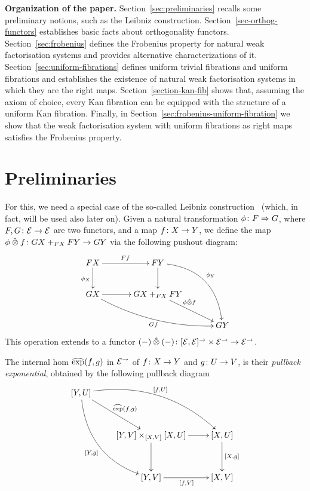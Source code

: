 \documentclass[reqno,10pt,a4paper,oneside]{amsart}
\begin{document}
\smallskip

\noindent
\textbf{Organization of the paper.} Section~\ref{sec:preliminaries} recalls some preliminary notions,
such as the Leibniz construction.
Section~\ref{sec-orthog-functors} establishes basic facts about orthogonality functors.
Section~\ref{sec:frobenius} defines the Frobenius property for natural weak factorisation
systems and provides alternative characterizations of it. 
Section~\ref{sec:uniform-fibrations} defines uniform trivial fibrations and uniform fibrations and
establishes the existence of natural weak factorisation systems in which they are the 
right maps.
Section~\ref{section-kan-fib} shows that, assuming the axiom of choice, every Kan fibration
can be equipped with the structure of a uniform Kan fibration.
Finally, in Section~\ref{sec:frobenius-uniform-fibration} we show that the weak factorisation system with
uniform fibrations as right maps satisfies the Frobenius property.


  
\section{Preliminaries}

For this,
we need a special case of the so-called Leibniz construction~\cite{riehl-verity:reedy} (which, in fact, will be used also later on). Given a natural transformation $\phi \colon F \Rightarrow
G$, where $F, G \colon \mathcal{E} \to \mathcal{E}$ are two functors, and a map $f \colon X \to Y$, we define the map~$\phi \mathbin{\hat{\otimes}} f \colon GX +_{FX} FY \to GY$ via the following
pushout diagram:
 \[
\xymatrix@C=1.2cm{
FX \ar[r]^{Ff}  \ar[d]_{\phi_X} & FY  \ar@/^2pc/[ddr]^{\phi_Y} \ar[d] & \\ 
GX \ar@/_1pc/[drr]_{Gf} \ar[r] &  GX +_{FX} FY \ar[dr]^-(.35){\phi \hatotimes f}  & \\ 
 & & GY } 
 \]
This operation extends to a functor $(-) \mathbin{\hat{\otimes}} (-) \colon [\mathcal{E}, \mathcal{E}]^\to \times \mathcal{E}^\to \to \mathcal{E}^\to$. 

The internal hom $\operatorname{\widehat{exp}}(f,g)$ in $\mathcal{E}^\to$ of $f \colon X \to Y$ and $g \colon U \to V$, is their \emph{pullback exponential}, obtained by the following pullback diagram
\[
\xymatrix@R=1.2cm{
[Y, U] \ar@/^2pc/[drr]^{[f,U]} \ar@/_2pc/[ddr]_{[Y,g]}  \ar[dr]^{\hatexp(f,g)} & & \\ 
 & [Y,V] \times_{[X,V]} [X,U]  \ar[d] \ar[r] & [X,U] \ar[d]^{[X,g]} \\
 & [Y,V] \ar[r]_{[f,V]} & [X,V] }
 \]
 
\end{document}
